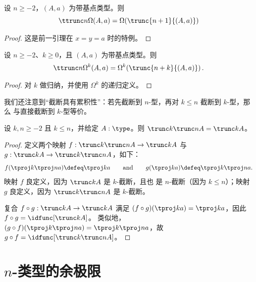 \begin{cor}
  设 $n\ge-2$，$(A,a)$ 为带基点类型。则
  \[\ttrunc n{\Omega(A,a)}=\Omega\mathopen{}\left(\trunc{n+1}{(A,a)}\right)\]
\end{cor}
\begin{proof}
  这是前一引理在 $x=y=a$ 时的特例。
\end{proof}

\begin{cor}
  设 $n\ge -2$、$k\ge 0$，且 $(A,a)$ 为带基点类型。则
  \[\ttrunc n{\Omega^k(A,a)} = \Omega^k\mathopen{}\left(\trunc{n+k}{(A,a)}\right). \]
\end{cor}
\begin{proof}
  对 $k$ 做归纳，并使用 $\Omega^k$ 的递归定义。
\end{proof}

我们还注意到“截断具有累积性”：若先截断到 $n$-型，再对 $k\le n$ 截断到 $k$-型，那么
与直接截断到 $k$-型等价。

\begin{lem} \label{lem:truncation-le}
  设 $k,n\ge-2$ 且 $k\le{}n$，并给定 $A:\type$。则
  $\trunc k{\trunc nA}=\trunc kA$。
\end{lem}
\begin{proof}
  定义两个映射 $f:\trunc k{\trunc nA}\to\trunc kA$ 与
  $g:\trunc kA\to\trunc k{\trunc nA}$，如下：
  \[
   f(\tproj k{\tproj na}) \defeq \tproj ka
   \qquad\text{and}\qquad
   g(\tproj ka) \defeq \tproj k{\tproj na}.
  \]
  映射 $f$ 良定义，因为 $\trunc kA$ 是 $k$-截断，且也
  是 $n$-截断（因为 $k\le{}n$）；映射 $g$ 良定义，因为
  $\trunc k{\trunc nA}$ 是 $k$-截断。

  复合 $f\circ{}g:\trunc kA\to\trunc kA$ 满足
  $(f\circ{}g)(\tproj ka)=\tproj ka$，因此 $f\circ{}g=\idfunc[\trunc kA]$。
  类似地，$(g\circ{}f)(\tproj k{\tproj na})=\tproj k{\tproj na}$，故 $g\circ{}f=\idfunc[\trunc k{\trunc nA}]$。
\end{proof}


%
\section{\texorpdfstring{$n$}{n}-类型的余极限}
\label{sec:pushouts}

